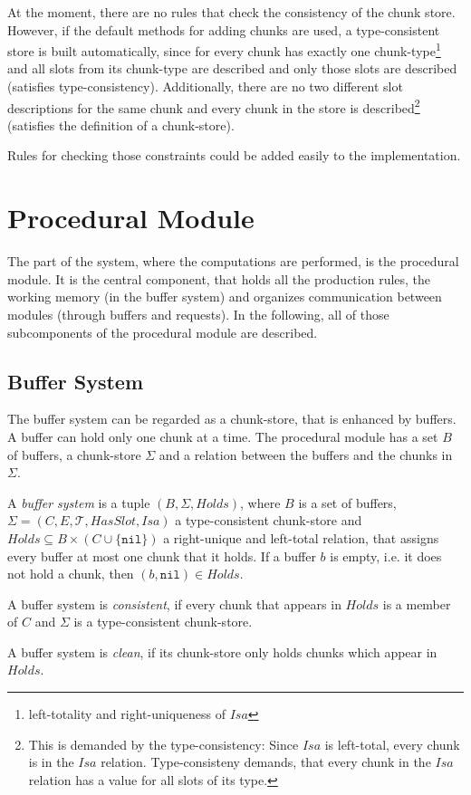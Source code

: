 At the moment, there are no rules that check the consistency of the chunk store. However, if the default methods for adding chunks are used, a type-consistent store is built automatically, since for every chunk has exactly one chunk-type\footnote{left-totality and right-uniqueness of $Isa$} and all slots from its chunk-type are described and only those slots are described (satisfies type-consistency). Additionally, there are no two different slot descriptions for the same chunk and every chunk in the store is described\footnote{This is demanded by the type-consistency: Since $Isa$ is left-total, every chunk is in the $Isa$ relation. Type-consisteny demands, that every chunk in the $Isa$ relation has a value for all slots of its type.} (satisfies the definition of a chunk-store).

Rules for checking those constraints could be added easily to the implementation.

\section{Procedural Module}
\label{implementation:procedural_module}

The part of the system, where the computations are performed, is the procedural module. It is the central component, that holds all the production rules, the working memory (in the buffer system) and organizes communication between modules (through buffers and requests). In the following, all of those subcomponents of the procedural module are described.

\subsection{Buffer System}
\label{implementation:buffer_system}

The buffer system can be regarded as a chunk-store, that is enhanced by buffers. A buffer can hold only one chunk at a time. The procedural module has a set $B$ of buffers, a chunk-store $\Sigma$ and a relation between the buffers and the chunks in $\Sigma$.

\begin{definition}
\label{def:buffer_system}
A \emph{buffer system} is a tuple $(B,\Sigma,Holds)$, where $B$ is a set of buffers, $\Sigma = (C, E, \mathcal{T}, HasSlot, Isa)$ a type-consistent chunk-store and $Holds \subseteq B \times (C \cup \{ \mathtt{nil} \})$ a right-unique and left-total relation, that assigns every buffer at most one chunk that it holds. If a buffer $b$ is empty, i.e. it does not hold a chunk, then $(b,\mathtt{nil}) \in Holds$.

A buffer system is \emph{consistent}, if every chunk that appears in $Holds$ is a member of $C$ and $\Sigma$ is a type-consistent chunk-store.

A buffer system is \emph{clean}, if its chunk-store only holds chunks which appear in $Holds$.
\end{definition}

